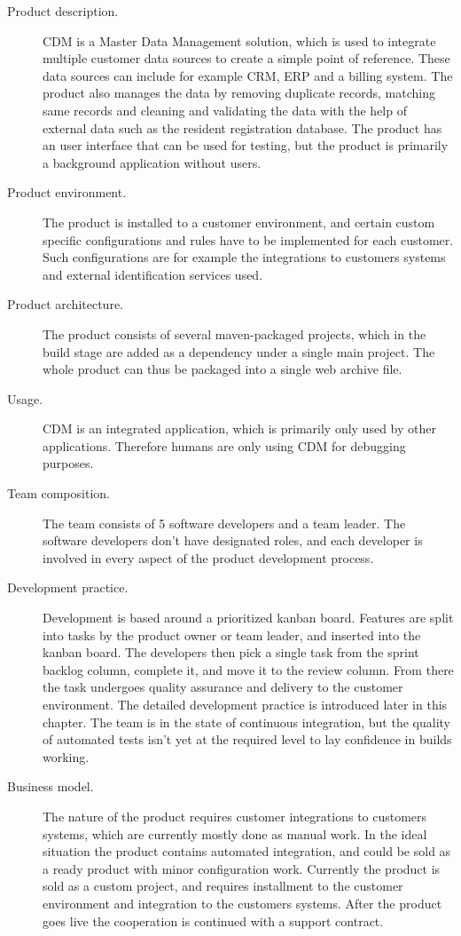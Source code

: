 \documentclass[english]{tktltiki2}
\theoremstyle{definition}
\theoremstyle{remark}
\begin{document}
\begin{description}
  \item[Product description.] CDM is a Master Data Management \cite{loshin2010master} solution, which is used to integrate multiple customer data sources to create a simple point of reference. These data sources can include for example CRM, ERP and a billing system. The product also manages the data by removing duplicate records, matching same records and cleaning and validating the data with the help of external data such as the resident registration database. The product has an user interface that can be used for testing, but the product is primarily a background application without users. 
  \item[Product environment.] The product is installed to a customer environment, and certain custom specific configurations and rules have to be implemented for each customer. Such configurations are for example the integrations to customers systems and external identification services used. 
  \item[Product architecture.] The product consists of several maven-packaged projects, which in the build stage are added as a dependency under a single main project. The whole product can thus be packaged into a single web archive file.
  \item[Usage.] CDM is an integrated application, which is primarily only used by other applications. Therefore humans are only using CDM for debugging purposes.
  \item[Team composition.] The team consists of 5 software developers and a team leader. The software developers don't have designated roles, and each developer is involved in every aspect of the product development process.
  \item[Development practice.] Development is based around a prioritized kanban board. Features are split into tasks by the product owner or team leader, and inserted into the kanban board. The developers then pick a single task from the sprint backlog column, complete it, and move it to the review column. From there the task undergoes quality assurance and delivery to the customer environment. The detailed development practice is introduced later in this chapter. The team is in the state of continuous integration, but the quality of automated tests isn't yet at the required level to lay confidence in builds working. 
  \item[Business model.] The nature of the product requires customer integrations to customers systems, which are currently mostly done as manual work. In the ideal situation the product contains automated integration, and could be sold as a ready product with minor configuration work. Currently the product is sold as a custom project, and requires installment to the customer environment and integration to the customers systems. After the product goes live the cooperation is continued with a support contract.

\end{description}
\end{document}
